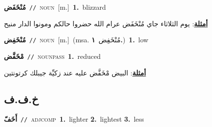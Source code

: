 \documentclass[10pt,a4paper,twoside]{article} %
\begin{document}
\begin{multicols}{2}
{\setlength\topsep{0pt}\textbf{\foreignlanguage{arabic}{مُنْخَفَض}}\ {\color{gray}\texttt{//}\color{black}}\ \textsc{noun}\ [m.]\ \textbf{1.}~blizzard\  \begin{flushright}\color{gray}\foreignlanguage{arabic}{\textbf{\underline{\foreignlanguage{arabic}{أمثلة}}}: يوم الثلاثاء جاي مُنْخَفَض عرام الله حضروا حالكم ومونوا الدار منيح}\end{flushright}\color{black}} \vspace{2mm}

{\setlength\topsep{0pt}\textbf{\foreignlanguage{arabic}{مُنْخَفِض}}\ {\color{gray}\texttt{//}\color{black}}\ \textsc{noun}\ [m.]\ \color{gray}(msa. \foreignlanguage{arabic}{مُنْخَفِض}~\foreignlanguage{arabic}{\textbf{١.}})\color{black}\ \textbf{1.}~low\ } \vspace{2mm}

{\setlength\topsep{0pt}\textbf{\foreignlanguage{arabic}{مْخَفَّض}}\ {\color{gray}\texttt{//}\color{black}}\ \textsc{noun\textunderscore pass}\ \textbf{1.}~reduced\  \begin{flushright}\color{gray}\foreignlanguage{arabic}{\textbf{\underline{\foreignlanguage{arabic}{أمثلة}}}: البيض مْخَفَّض عليه عند زكيِّة جيبلك كرتونتين}\end{flushright}\color{black}} \vspace{2mm}

\vspace{-3mm}
\subsection*{\color{blue}\foreignlanguage{arabic}{خ.ف.ف}\color{blue}{}} 

{\setlength\topsep{0pt}\textbf{\foreignlanguage{arabic}{أَخَفّ}}\ {\color{gray}\texttt{//}\color{black}}\ \textsc{adj\textunderscore comp}\ \textbf{1.}~lighter  \textbf{2.}~lightest  \textbf{3.}~less\ } \vspace{2mm}


\end{multicols}
\end{document}
